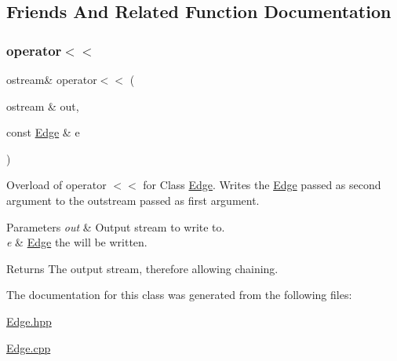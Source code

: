 \subsection{Friends And Related Function Documentation}
\hypertarget{class_edge_a4ba287cbdc78be9ec49dd1b67291039b}{}\label{class_edge_a4ba287cbdc78be9ec49dd1b67291039b} 
\subsubsection{\texorpdfstring{operator$<$$<$}{operator<<}}
{\footnotesize\ttfamily ostream\& operator$<$$<$ (\begin{DoxyParamCaption}\item[{ostream \&}]{out,  }\item[{const \hyperlink{class_edge}{Edge} \&}]{e }\end{DoxyParamCaption})\hspace{0.3cm}{\ttfamily [friend]}}

Overload of operator $<$$<$ for Class \hyperlink{class_edge}{Edge}. Writes the \hyperlink{class_edge}{Edge} passed as second argument to the outstream passed as first argument.


\begin{DoxyParams}{Parameters}
{\em out} & Output stream to write to. \\
\hline
{\em e} & \hyperlink{class_edge}{Edge} the will be written.\\
\hline
\end{DoxyParams}
\begin{DoxyReturn}{Returns}
The output stream, therefore allowing chaining. 
\end{DoxyReturn}


The documentation for this class was generated from the following files\+:\begin{DoxyCompactItemize}
\item 
\hyperlink{_edge_8hpp}{Edge.\+hpp}\item 
\hyperlink{_edge_8cpp}{Edge.\+cpp}\end{DoxyCompactItemize}
